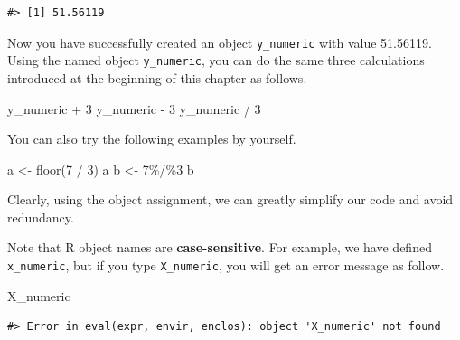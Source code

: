 \documentclass[
]{book}
\newenvironment{Shaded}{\begin{snugshade}}{\end{snugshade}}
\newcommand{\DecValTok}[1]{\textcolor[rgb]{0.00,0.00,0.81}{#1}}
\newcommand{\FunctionTok}[1]{\textcolor[rgb]{0.00,0.00,0.00}{#1}}
\newcommand{\NormalTok}[1]{#1}
\newcommand{\OtherTok}[1]{\textcolor[rgb]{0.56,0.35,0.01}{#1}}
\newcommand{\SpecialCharTok}[1]{\textcolor[rgb]{0.00,0.00,0.00}{#1}}
\begin{document}
\begin{verbatim}
#> [1] 51.56119
\end{verbatim}

Now you have successfully created an object \texttt{y\_numeric} with value 51.56119. Using the named object \texttt{y\_numeric}, you can do the same three calculations introduced at the beginning of this chapter as follows.

\begin{Shaded}
\begin{Highlighting}[]
\NormalTok{y\_numeric }\SpecialCharTok{+} \DecValTok{3}
\NormalTok{y\_numeric }\SpecialCharTok{{-}} \DecValTok{3}
\NormalTok{y\_numeric }\SpecialCharTok{/} \DecValTok{3}
\end{Highlighting}
\end{Shaded}

You can also try the following examples by yourself.

\begin{Shaded}
\begin{Highlighting}[]
\NormalTok{a }\OtherTok{\textless{}{-}} \FunctionTok{floor}\NormalTok{(}\DecValTok{7} \SpecialCharTok{/} \DecValTok{3}\NormalTok{) }
\NormalTok{a}
\NormalTok{b }\OtherTok{\textless{}{-}} \DecValTok{7}\SpecialCharTok{\%/\%}\DecValTok{3}
\NormalTok{b}
\end{Highlighting}
\end{Shaded}

Clearly, using the object assignment, we can greatly simplify our code and avoid redundancy.

Note that R object names are \textbf{case-sensitive}. For example, we have defined \texttt{x\_numeric}, but if you type \texttt{X\_numeric}, you will get an error message as follow.

\begin{Shaded}
\begin{Highlighting}[]
\NormalTok{X\_numeric}
\end{Highlighting}
\end{Shaded}

\begin{verbatim}
#> Error in eval(expr, envir, enclos): object 'X_numeric' not found
\end{verbatim}
\end{document}
